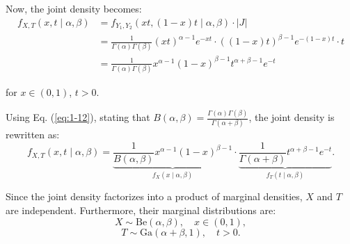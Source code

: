 Now, the joint density becomes:
\begin{align}
f_{X,T}(x, t \mid \alpha, \beta) &= f_{Y_1, Y_2}(x t, (1 - x)t \mid \alpha, \beta) \cdot |J| \\
&= \frac{1}{\Gamma(\alpha) \Gamma(\beta)} (x t)^{\alpha - 1} e^{-x t} \cdot ((1 - x) t)^{\beta - 1} e^{-(1 - x) t} \cdot t \\
&= \frac{1}{\Gamma(\alpha)\Gamma(\beta)} x^{\alpha - 1} (1 - x)^{\beta - 1} t^{\alpha + \beta - 1} e^{-t}
\end{align}

for \(x \in (0,1)\), \(t > 0\).


Using Eq. (\ref{eq:1-12}), stating that $B(\alpha, \beta) = \frac{\Gamma(\alpha)\Gamma(\beta)}{\Gamma(\alpha + \beta)}$, the joint density is rewritten as:
\begin{equation}
f_{X,T}(x, t \mid \alpha, \beta) = \underbrace{\frac{1}{B(\alpha, \beta)} x^{\alpha - 1} (1 - x)^{\beta - 1}}_{f_X(x \mid \alpha, \beta)} \cdot \underbrace{\frac{1}{\Gamma(\alpha + \beta)} t^{\alpha + \beta - 1} e^{-t}}_{f_T(t \mid \alpha, \beta)}.
\end{equation}

Since the joint density factorizes into a product of marginal densities, \(X\) and \(T\) are independent. Furthermore, their marginal distributions are:
\[
X \sim \text{Be}(\alpha, \beta), \quad x \in (0,1),
\]
\[
T \sim \text{Ga}(\alpha + \beta, 1), \quad t > 0.
\]







